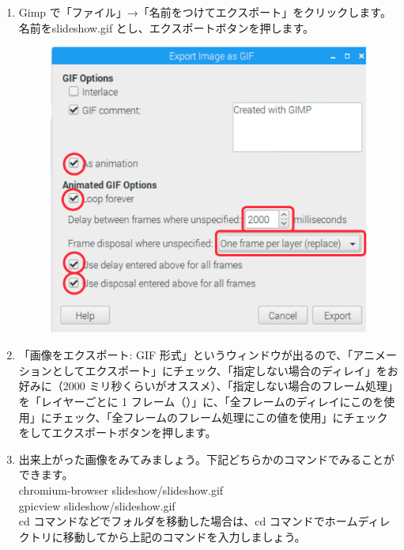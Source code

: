 \begin{enumerate}
\item Gimp で「ファイル」→「名前をつけてエクスポート」をクリックします。名前をslideshow.gif とし、エクスポートボタンを押します。
\begin{figure}[H]
    \centering
    \includegraphics[width=0.6\linewidth]{images/chap03/text03-img026.png}
\end{figure}
\item 「画像をエクスポート: GIF 形式」というウィンドウが出るので、「アニメーションとしてエクスポート」にチェック、「指定しない場合のディレイ」をお好みに（2000 ミリ秒くらいがオススメ）、「指定しない場合のフレーム処理」を「レイヤーごとに 1 フレーム（）」に、「全フレームのディレイにこのを使用」にチェック、「全フレームのフレーム処理にこの値を使用」にチェックをしてエクスポートボタンを押します。\\
\item 出来上がった画像をみてみましょう。下記どちらかのコマンドでみることができます。\\
chromium-browser slideshow/slideshow.gif\\
gpicview slideshow/slideshow.gif\\
cd コマンドなどでフォルダを移動した場合は、cd コマンドでホームディレクトリに移動してから上記のコマンドを入力しましょう。
\end{enumerate}

\begin{tcolorbox}[title=\useOmetoi]
\begin{enumerate}
\end{enumerate}
\end{tcolorbox}
